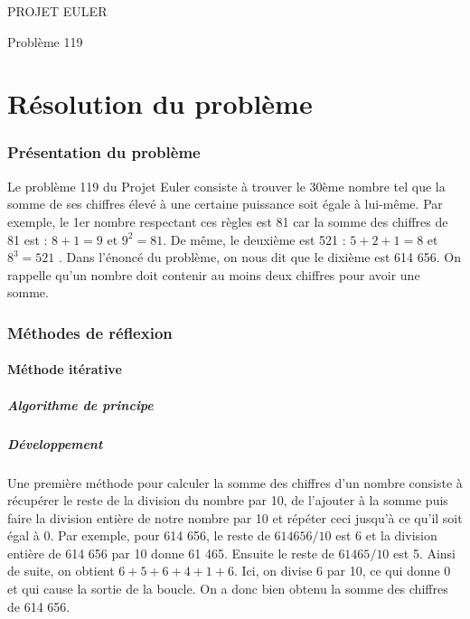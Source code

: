 \documentclass{article}
\newcommand{\code}[3]{}
\begin{document}
\hfill
\hfill
\hfill
\begin{center}
  \large{PROJET EULER}

  Problème 119
\end{center}
\tableofcontents
\part {Résolution du problème}
\section {Présentation du problème}

Le problème 119 du Projet Euler consiste à trouver le 30ème nombre tel que la somme de ses chiffres élevé à une certaine puissance soit égale à lui-même. Par exemple, le 1er nombre respectant ces règles est 81 car la somme des chiffres de 81 est : $ 8 + 1 = 9 $ et $ 9^{2} = 81 $. De même, le deuxième est 521 : $ 5 + 2 + 1 = 8 $ et $ 8^{3} = 521 $	. Dans l'énoncé du problème, on nous dit que le dixième est 614 656. On rappelle qu'un nombre doit contenir au moins deux chiffres pour avoir une somme.

\section{Méthodes de réflexion}

\subsection{Méthode itérative}

\subsubsection{Algorithme de principe}
\code{1}{8}{problem119_1_principe.txt}

\subsubsection{Développement}
Une première méthode pour calculer la somme des chiffres d'un nombre consiste à récupérer le reste de la division du nombre par 10, de l'ajouter à la somme puis faire la division entière de notre nombre par 10 et répéter ceci jusqu'à ce qu'il soit égal à 0. Par exemple, pour 614 656, le reste de $614656/10$ est 6 et la division entière de 614 656 par 10 donne 61 465. Ensuite le reste de $61465/10$ est 5. Ainsi de suite, on obtient $6 + 5 + 6 + 4 + 1 + 6$. Ici, on divise 6 par 10, ce qui donne 0 et qui cause la sortie de la boucle. On a donc bien obtenu la somme des chiffres de 614 656.
\end{document}
